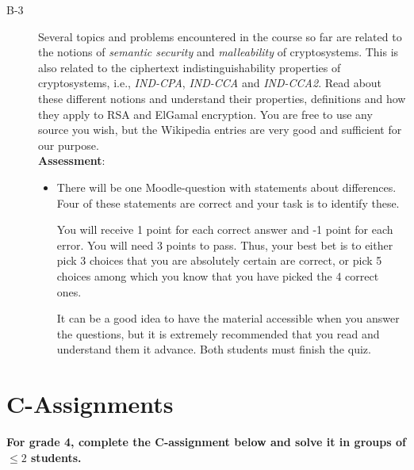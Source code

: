 \documentclass{article}
\begin{document}
\begin{description}
			\item[B-3]{Several topics and problems encountered in the course so far are related to the notions of \textit{semantic security} and \textit{malleability} of cryptosystems. This is also related to the ciphertext indistinguishability properties of cryptosystems, i.e., \textit{IND-CPA}, \textit{IND-CCA} and \textit{IND-CCA2}. Read about these different notions and understand their properties, definitions and how they apply to RSA and ElGamal encryption. You are free to use any source you wish, but the Wikipedia entries are very good and sufficient for our purpose.\\
				\textbf{Assessment}:
				\begin{itemize}
					\item There will be one Moodle-question with statements about differences. Four of these statements are correct and your task is to identify these.  
					
					You will receive 1 point for each correct answer and -1 point for each error. You will need 3 points to pass. Thus, your best bet is to either pick 3 choices that you are absolutely certain are correct, or pick 5 choices among which you know that you have picked the 4 correct ones.
					
					It can be a good idea to have the material accessible when you answer the questions, but it is extremely recommended that you read and understand them it advance. Both students must finish the quiz.
				\end{itemize}}
				
				
			\end{description}
			
			\section*{C-Assignments}
			\textbf{For grade 4, complete the C-assignment below and solve it in groups of $\leq 2$ students.}
			
\end{document}
